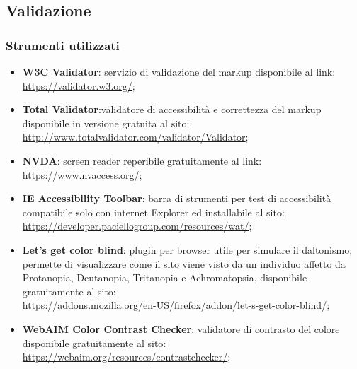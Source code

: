 \documentclass[a4paper,12pt]{article}
\begin{document}
\subsection{Validazione}
\subsubsection{Strumenti utilizzati}
\begin{itemize}
	\item \textbf{W3C Validator}: servizio di validazione del markup disponibile al link:\\
	\url{https://validator.w3.org/};
	
	\item \textbf{Total Validator}:validatore di accessibilità e correttezza del markup disponibile in versione gratuita al sito:\\
	\url{http://www.totalvalidator.com/validator/Validator};
	
	\item \textbf{NVDA}: screen reader reperibile gratuitamente al link:\\
	\url{https://www.nvaccess.org/};
	
	\item \textbf{IE Accessibility Toolbar}: barra di strumenti per test di accessibilità compatibile solo con internet Explorer ed installabile al sito:\\
	\url{https://developer.paciellogroup.com/resources/wat/};
	
	\item \textbf{Let's get color blind}: plugin per browser utile per simulare il daltonismo; permette di visualizzare come il sito viene visto da un individuo affetto da Protanopia, Deutanopia, Tritanopia e Achromatopsia, disponibile gratuitamente al sito:\\
	\url{https://addons.mozilla.org/en-US/firefox/addon/let-s-get-color-blind/};
	
	\item \textbf{WebAIM Color Contrast Checker}: validatore di contrasto del colore disponibile gratuitamente al sito:\\
	\url{https://webaim.org/resources/contrastchecker/};
\end{itemize}
\end{document}
